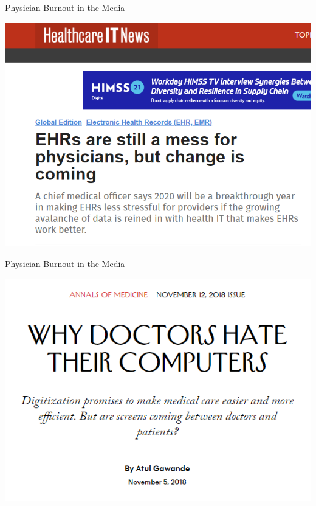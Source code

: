 \documentclass[10pt]{beamer}
\begin{document}
\begin{frame}[noframenumbering]{Physician Burnout in the Media}
\begin{center}
    \includegraphics[scale=.4]{graphics/News Clip1.PNG}
\end{center}
\end{frame}

\begin{frame}[noframenumbering]{Physician Burnout in the Media}
\begin{center}
    \includegraphics[scale=.5]{graphics/News Clip2.PNG}
\end{center}
\end{frame}
\end{document}
